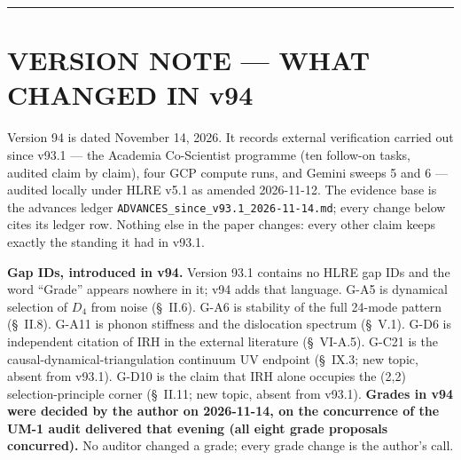 \documentclass[a4paper,11pt]{article}
\begin{document}
\begin{abstract}
\textbf{What is excluded by theorem.} SO(8) cannot be the gauge algebra, by two independent proofs. The Standard Model algebra does not embed in $\mathfrak{so}(8)$ by any route. The anisotropy coefficient $\xi_2=-1/384$ is not derivable from the stated lattice. Both time-step values stated in v92 violate the framework's own stability bound. Three generations is \textbf{not} a derived result: five candidate mechanisms were tested and all five are closed. Monopole absence, claimed in earlier versions, is withdrawn: it would be inconsistent with $E_6$ realised as a broken gauge group (\S~V.3).

\textbf{What remains open} is stated exhaustively in \S~IX, classified by the type of work each item requires. Every correction made during verification --- including corrections to the author's own prior output --- is recorded in the appendices, and every externally attributable claim carries a linked numerical citation.

The framework claims substantially less than v92 did. What it now claims has been checked --- by hand, by simulation, by independent reproduction, and now by machine. Version 94 (November 14, 2026) adds a front version note recording external-verification results since v93.1; every grade change in it was decided by the author on 2026-11-14, on the concurrence of an independent audit delivered that evening.
\end{abstract}
\vspace{1.2cm}
\hrule
\vspace{1.4cm}
\section*{VERSION NOTE --- WHAT CHANGED IN v94}

Version 94 is dated November 14, 2026. It records external verification carried out since v93.1 --- the Academia Co-Scientist programme (ten follow-on tasks, audited claim by claim), four GCP compute runs, and Gemini sweeps 5 and 6 --- audited locally under HLRE v5.1 as amended 2026-11-12. The evidence base is the advances ledger \texttt{ADVANCES\_since\_v93.1\_2026-11-14.md}; every change below cites its ledger row. Nothing else in the paper changes: every other claim keeps exactly the standing it had in v93.1.

\textbf{Gap IDs, introduced in v94.} Version 93.1 contains no HLRE gap IDs and the word ``Grade'' appears nowhere in it; v94 adds that language. G-A5 is dynamical selection of $D_4$ from noise (\S~II.6). G-A6 is stability of the full 24-mode pattern (\S~II.8). G-A11 is phonon stiffness and the dislocation spectrum (\S~V.1). G-D6 is independent citation of IRH in the external literature (\S~VI-A.5). G-C21 is the causal-dynamical-triangulation continuum UV endpoint (\S~IX.3; new topic, absent from v93.1). G-D10 is the claim that IRH alone occupies the (2,2) selection-principle corner (\S~II.11; new topic, absent from v93.1). \textbf{Grades in v94 were decided by the author on 2026-11-14, on the concurrence of the UM-1 audit delivered that evening (all eight grade proposals concurred).} No auditor changed a grade; every grade change is the author's call.
\end{document}
